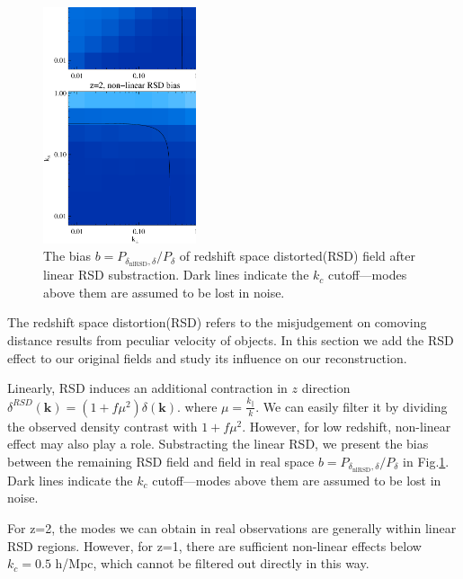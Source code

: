 \begin{figure}[tbp]
\begin{center}
\includegraphics[width=0.4\textwidth]{compare_bias_rsdsub_z1z2.eps}
\end{center}
\vspace{-0.7cm}
\caption{The bias $b=P_{\delta_\mathrm{nlRSD},\delta}/P_{\delta}$ 
of redshift space distorted(RSD) field after linear RSD substraction.
Dark lines indicate the $k_c$ cutoff---modes above them are assumed to be lost in noise.}
\label{fig:bias}
\end{figure}
The redshift space distortion(RSD) refers to the misjudgement on comoving distance 
results from peculiar velocity of objects. 
In this section we add the RSD effect to our original fields and study its influence on our reconstruction. 

Linearly, RSD induces an additional contraction in $z$ direction 
$\delta^{RSD}(\bm{k})=(1+f\mu^2)\delta(\bm{k})$. 
where $\mu=\frac{k_\parallel}{k}$. 
We can easily filter it by dividing the observed density contrast with $1+f\mu^2$. 
However, for low redshift, non-linear effect may also play a role.
Substracting the linear RSD, we present the bias between the remaining RSD field 
and field in real space 
$b=P_{\delta_\mathrm{nlRSD},\delta}/P_{\delta}$  
in Fig.\ref{fig:bias}. 
Dark lines indicate the $k_c$ cutoff---modes above them are assumed to be lost in noise.

For z=2, the modes we can obtain in real observations are generally 
within linear RSD regions. 
However, for z=1, there are sufficient non-linear effects below $k_c=0.5$ h/Mpc, which cannot be filtered out directly in this way.  

